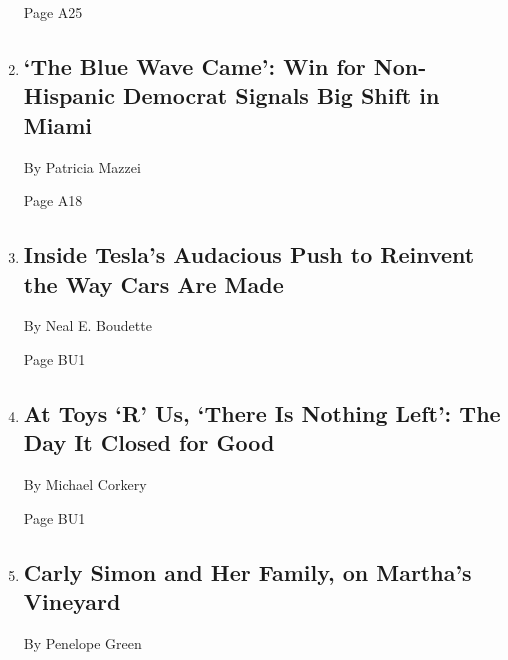 \begin{enumerate}
  Page A25
\item
  \href{/2018/06/30/us/miami-little-havana-cuban.html}{}

  \hypertarget{the-blue-wave-came-win-for-non-hispanic-democrat-signals-big-shift-in-miami}{%
  \subsection{`The Blue Wave Came': Win for Non-Hispanic Democrat
  Signals Big Shift in
  Miami}\label{the-blue-wave-came-win-for-non-hispanic-democrat-signals-big-shift-in-miami}}

  By Patricia Mazzei

  Page A18
\item
  \href{/2018/06/30/business/tesla-factory-musk.html}{}

  \hypertarget{inside-teslas-audacious-push-to-reinvent-the-way-cars-are-made}{%
  \subsection{Inside Tesla's Audacious Push to Reinvent the Way Cars Are
  Made}\label{inside-teslas-audacious-push-to-reinvent-the-way-cars-are-made}}

  By Neal E. Boudette

  Page BU1
\item
  \href{/2018/06/30/business/toys-r-us-closing.html}{}

  \hypertarget{at-toys-r-us-there-is-nothing-left-the-day-it-closed-for-good}{%
  \subsection{At Toys `R' Us, `There Is Nothing Left': The Day It Closed
  for
  Good}\label{at-toys-r-us-there-is-nothing-left-the-day-it-closed-for-good}}

  By Michael Corkery

  Page BU1
\item
  \href{/2018/06/30/style/carly-simon-family-band-marthas-vineyard.html}{}

  \hypertarget{carly-simon-and-her-family-on-marthas-vineyard}{%
  \subsection{Carly Simon and Her Family, on Martha's
  Vineyard}\label{carly-simon-and-her-family-on-marthas-vineyard}}

  By Penelope Green


\end{enumerate}
